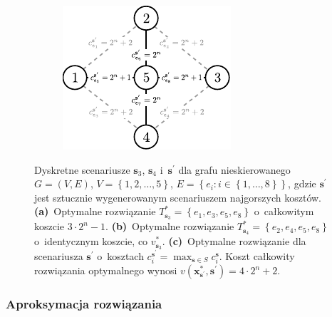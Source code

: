 \begin{figure}[!htbp]
\begin{subfigure}[b]{0.3\textwidth}
		\label{fig:minmaxregexample2:b}
	\end{subfigure}
	\hfill
	\begin{subfigure}[b]{0.3\textwidth}
		\includegraphics[width=\textwidth]{Chapter_II/MIN-MAX-REG2-example/c}
		\caption{}
		\label{fig:minmaxregexample2:c}
	\end{subfigure}
	\hfill\null
	\caption{
		Dyskretne scenariusze $\textbf{s}_{3}$, $\textbf{s}_{4}$ i~$\textbf{s}^{\prime}$ dla grafu nieskierowanego $G = \left( V, E \right)$, $V = \left\{ 1, 2, \dots, 5 \right\}$, $E = \left\{ e_{i} : i \in \left\{ 1, \dots, 8 \right\} \right\}$, gdzie $\textbf{s}^{\prime}$ jest sztucznie wygenerowanym scenariuszem najgorszych kosztów.
		\textbf{(a)}~Optymalne rozwiązanie $T^{\ast}_{\textbf{s}_{3}} = \left\{ e_{1}, e_{3}, e_{5}, e_{8} \right\}$ o~całkowitym koszcie $3 \cdot 2^{n} - 1$.
		\textbf{(b)}~Optymalne rozwiązanie $T^{\ast}_{\textbf{s}_{4}} = \left\{ e_{2}, e_{4}, e_{5}, e_{8} \right\}$ o~identycznym koszcie, co $v^{\ast}_{\textbf{s}_{3}}$.
		\textbf{(c)}~Optymalne rozwiązanie dla scenariusza $\textbf{s}^{\prime}$ o~kosztach $c_{i}^{\textbf{s}^{\prime}} = \max_{\textbf{s} \in S} c_{i}^{\textbf{s}}$.
		Koszt całkowity rozwiązania optymalnego wynosi $v \left( \textbf{x}^{\ast}_{\textbf{s}^{\prime}}, \textbf{s}^{\prime} \right) = 4 \cdot 2^{n} + 2$.
	}
	\label{fig:minmaxregexample2}
\end{figure}


\subsubsection{Aproksymacja rozwiązania}


